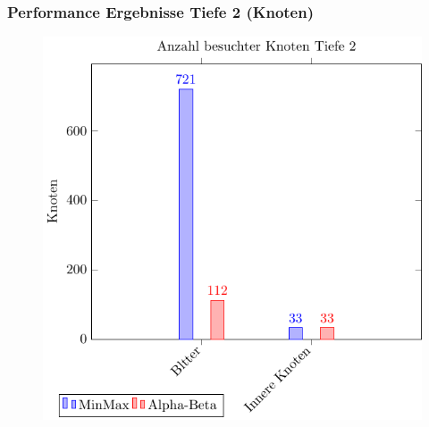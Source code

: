 \documentclass{beamer}
\begin{document}

\begin{frame}
\frametitle{Performance Ergebnisse Tiefe 2 (Knoten)}
  \begin{figure}
    \centering
    \includegraphics[scale=0.8]{figures/node-2.pdf}
  \end{figure}

\end{frame}
\end{document}
